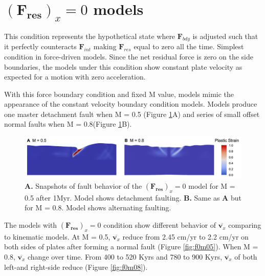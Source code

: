 \documentclass[letterpaper,12pt,notitle]{memphisthesis}                     %
\begin{document}
\section{$(\boldsymbol{F_{res}})_x=0$ models}

This condition represents the hypothetical state where $\boldsymbol{F}_{bdy}$ is adjusted such that it perfectly counteracts $\boldsymbol{F}_{int}$ making $\boldsymbol{F}_{res}$ equal to zero all the time. Simplest condition in force-driven models. Since the net residual force is zero on the side boundaries, the models under this condition show constant plate velocity as expected for a motion with zero acceleration.

With this force boundary condition and fixed M value, models mimic the appearance of the constant velocity boundary condition models. %
Models produce one master detachment fault when M = 0.5 (Figure \ref{fig:f0fault}A) and series of small offset normal faults when M = 0.8(Figure \ref{fig:f0fault}B).
%
\begin{figure}[!htb]
	\centering
	\includegraphics[width=0.99\linewidth]{./figs/f0fault.png}
	\caption{\textbf{A.} Snapshots of fault behavior of the $(\boldsymbol{F_{res}})_x=0$ model for M = 0.5 after 1Myr. Model shows detachment faulting. \textbf{B.} Same as \textbf{A} but for M = 0.8. Model shows alternating faulting.}
	\label{fig:f0fault}
\end{figure}

The models with $(\boldsymbol{F_{res}})_x=0$ condition show different behavior of $\overline{\boldsymbol{v}_x}$ comparing to kinematic models. At M = 0.5, $\overline{\boldsymbol{v}_x}$ reduce from 2.45 cm/yr to 2.2 cm/yr on both sides of plates after forming a normal fault (Figure \ref{fig:f0m05}). 
When M = 0.8, $\overline{\boldsymbol{v}_x}$ change over time. From 400 to 520 Kyrs and 780 to 900 Kyrs, $\overline{\boldsymbol{v}_x}$ of both left-and right-side reduce (Figure \ref{fig:f0m08}).
\end{document}

